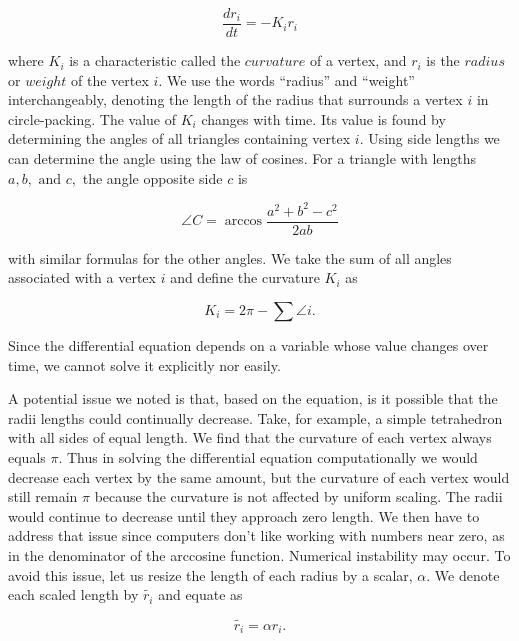 \documentclass[12pt]{article}
\begin{document}
  \begin{equation}
  \label{Riccif}
  \frac{dr_i}{{dt}} = -K_ir_i
  \end{equation}
  
\noindent where $K_i$ is a characteristic called the $curvature$ of a vertex, and $r_i$ is the $radius$ or $weight$ of the vertex $i$. We use the words ``radius'' and ``weight'' interchangeably, denoting the length of the radius that surrounds a vertex $i$ in circle-packing. The value of $K_i$ changes with time. Its value is found by determining the angles of all triangles containing vertex $i$. Using side lengths we can determine the angle using the law of cosines. For a triangle with lengths $a, b,\mbox{ and }c,$ the angle opposite side $c$ is
  
  $$
  \angle C = \arccos\frac{a^2 + b^2 - c^2}{2ab}
  $$
  
\noindent with similar formulas for the other angles. We take the sum of all angles associated with a vertex $i$ and define the curvature $K_i$ as

  \begin{equation}
  K_i = 2\pi - \sum{\angle i}.
  \end{equation}
  
\noindent Since the differential equation depends on a variable whose value changes over time, we cannot solve it explicitly nor easily.\newline
   
\noindent A potential issue we noted is that, based on the equation, is it possible that the radii lengths could continually decrease. Take, for example, a simple tetrahedron with all sides of equal length. We find that the curvature of each vertex always equals $\pi$. Thus in solving the differential equation computationally we would decrease each vertex by the same amount, but the curvature of each vertex would still remain $\pi$ because the curvature is not affected by uniform scaling. The radii would continue to decrease until they approach zero length. We then have to address that issue since computers don't like working with numbers near zero, as in the denominator of the arccosine function. Numerical instability may occur. To avoid this issue, let us resize the length of each radius by a scalar, $\alpha$. We denote each scaled length by $\tilde{r_i}$ and equate as
 
 \begin{equation}
 \tilde{r_i} = \alpha r_i.
 \end{equation} 
 
\end{document}
